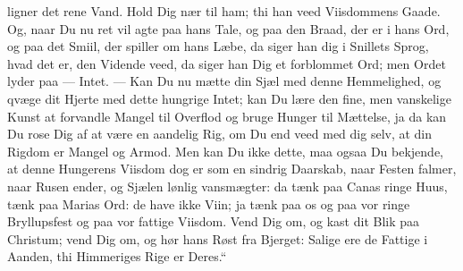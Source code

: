 \documentclass[12pt,a4paper]{book}
\begin{document}
ligner det rene Vand. Hold Dig nær til ham; thi han veed Viisdommens Gaade. Og, naar Du nu
ret vil agte paa hans Tale, og paa den Braad, der er i hans Ord, og paa det Smiil, der
spiller om hans Læbe, da siger han dig i Snillets Sprog, hvad det er, den Vidende veed, da
siger han Dig et forblommet Ord; men Ordet lyder paa --- Intet. --- Kan Du nu mætte din Sjæl
med denne Hemmelighed, og qvæge dit Hjerte med dette hungrige Intet; kan Du lære den fine,
men vanskelige Kunst at forvandle Mangel til Overflod og bruge Hunger til Mættelse, ja da
kan Du rose Dig af at være en aandelig Rig, om Du end veed med dig selv, at din Rigdom er
Mangel og Armod. Men kan Du ikke dette, maa ogsaa Du bekjende, at denne Hungerens Viisdom
dog er som en sindrig Daarskab, naar Festen falmer, naar Rusen ender, og Sjælen lønlig
vansmægter: da tænk paa Canas ringe Huus, tænk paa Marias Ord: de have ikke Viin; ja tænk
paa os og paa vor ringe Bryllupsfest og paa vor fattige Viisdom. Vend Dig om, og kast dit
Blik paa Christum; vend Dig om, og hør hans Røst fra Bjerget: {\large Salige ere de Fattige
i Aanden, thi Himmeriges Rige er Deres.}“
\end{document}
